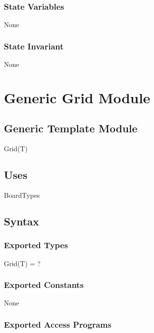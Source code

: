 \documentclass[12pt]{article}
\begin{document}
\subsubsection* {State Variables}

None

\subsubsection* {State Invariant}

None










\newpage

\section* {Generic Grid Module}

\subsection* {Generic Template Module}

Grid(T)

\subsection* {Uses}

BoardTypes

\subsection* {Syntax}

\subsubsection* {Exported Types}

Grid(T) = ?

\subsubsection* {Exported Constants}

None

\subsubsection* {Exported Access Programs}
\end{document}
